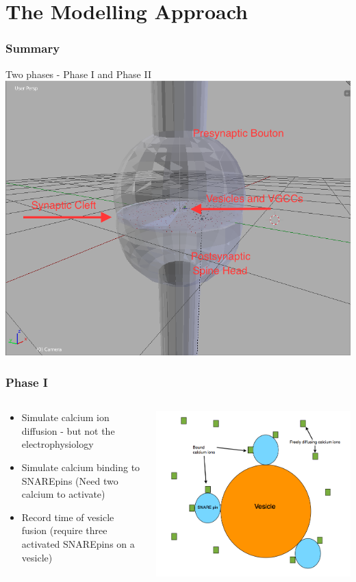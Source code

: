 \documentclass{beamer}
\begin{document}
\section{The Modelling Approach}
\frame
{
    \frametitle{Summary}
    Two phases - Phase I and Phase II
    \includegraphics[width=1\textwidth]{fig2.png}
}

\frame
{
    \frametitle{Phase I}
    \begin{columns}
    \begin{column}{0.5\textwidth}
    \begin{itemize}
        \item Simulate calcium ion diffusion - but not the electrophysiology
        \item Simulate calcium binding to SNAREpins (Need two calcium to activate)
        \item Record time of vesicle fusion (require three activated SNAREpins on a vesicle)
    \end{itemize}
    \end{column}
    \begin{column}{0.5\textwidth}
    \includegraphics[width=1\textwidth]{presynaptic.png}
    \end{column}
\end{columns}
}
\end{document}
